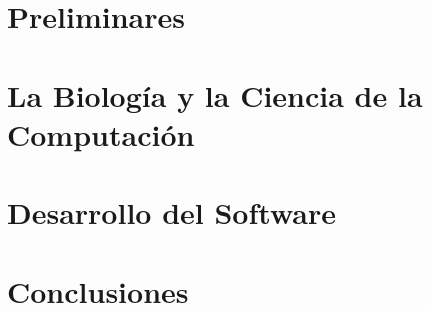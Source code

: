 \documentclass[a4paper,10pt]{report}
\theoremstyle{definition}
\begin{document}








\tableofcontents

\part{Preliminares}


\part{La Biolog\'ia y la Ciencia de la Computaci\'on}




\part{Desarrollo del Software}
\label{software}






\part{Conclusiones}


\cleardoublepage



\appendix

\end{document}
